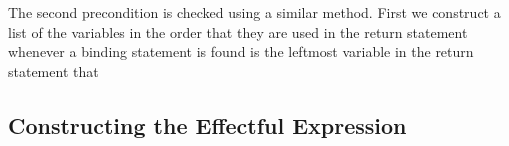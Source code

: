 The second precondition is checked using a similar method. First we construct a list of the variables in the order that they are used in the return statement\DIFdelbegin {}\DIFdelend \DIFaddbegin {}\texttt{} \DIFaddend whenever a binding statement is found \DIFdelbegin {}\DIFdelend \DIFaddbegin {}\DIFaddend is the leftmost variable in the return statement that \DIFdelbegin {}\DIFdelend \DIFaddbegin {}\DIFaddend 


\DIFdelbegin \subsubsection{}
\addtocounter{subsubsection}{-1}%
\DIFdelend \DIFaddbegin \subsection{Constructing the Effectful Expression}
